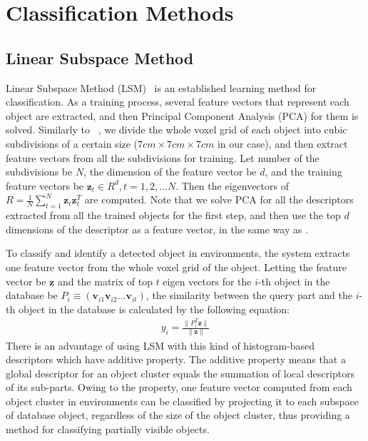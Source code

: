 \documentclass[conference]{sty/IEEEtran}
\begin{document}
\section{Classification Methods}
\label{sec:classification}

\subsection{Linear Subspace Method}
\label{sec:subspace}
Linear Subspace Method (LSM)~\cite{watanabe1973} is an established learning method for classification. 
As a training process, several feature vectors that represent each object are extracted, 
and then Principal Component Analysis (PCA) for them is solved. 
Similarly to ~\cite{kanezaki2010icra}, we divide the whole voxel grid of each object into 
cubic subdivisions of a certain size ($7cm\times7cm\times7cm$ in our case), and then extract feature vectors from all the subdivisions for training. 
Let number of the subdivisions be $N$, the dimension of the feature vector be $d$, 
and the training feature vectors be $\bm{z}_t \in R^d, t=1,2,...N$. 
Then the eigenvectors of $R=\frac{1}{N} \sum^{N}_{t=1} \bm{z}_t \bm{z}_t^T$ are computed. 
Note that we solve PCA for all the descriptors extracted from all the trained objects for the first step, 
and then use the top $d$ dimensions of the descriptor as a feature vector, in the same way as \cite{kanezaki2010icra}.

To classify and identify a detected object in environments, the system extracts one feature vector from the whole voxel grid of the object. 
Letting the feature vector be $\bm{z}$ and the matrix of top $t$ eigen vectors for the $i$-th object in the database be $P_i \equiv (\bm{v}_{i1} \bm{v}_{i2} ... \bm{v}_{it})$,
the similarity between the query part and the $i$-th object in the database is calculated by the following equation:
\begin{eqnarray}\label{eq:y_calc}
  y_i = \frac{\| P_i^T \bm{z} \|}{\| \bm{z} \|}
\end{eqnarray}
There is an advantage of using LSM with this kind of histogram-based descriptors which have additive property. 
The additive property means that a global descriptor for an object cluster equals the summation of local descriptors of its sub-parts. 
Owing to the property, one feature vector computed from each object cluster in environments can be classified by projecting it to 
each subspace of database object, regardless of the size of the object cluster, thus providing a method for classifying partially visible objects.
\end{document}
